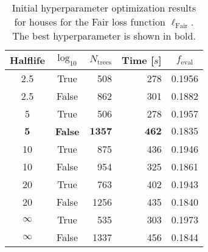 \begin{table}[h!]
  \centerfloat
  \begin{tabular}{@{}ccrrc@{}}
    Halflife & $\log_{10}$ & $N_\mathrm{trees}$ & Time [$s$] & $f_\mathrm{eval}$ \\
    \midrule
    \num{2.5} & True & \num{508} & \num{278} & \num{0.1956} \\
    \num{2.5} & False & \num{862} & \num{301} & \num{0.1882} \\
    \num{5} & True & \num{506} & \num{278} & \num{0.1957} \\
    $\mathbf{5}$ & \textbf{False} & $\mathbf{1357}$ & $\mathbf{462}$ & $\mathbf{0.1835}$ \\
    \num{10} & True & \num{875} & \num{436} & \num{0.1946} \\
    \num{10} & False & \num{954} & \num{325} & \num{0.1861} \\
    \num{20} & True & \num{763} & \num{402} & \num{0.1943} \\
    \num{20} & False & \num{1256} & \num{435} & \num{0.1840} \\
    $\infty$ & True & \num{535} & \num{303} & \num{0.1973} \\
    $\infty$ & False & \num{1337} & \num{456} & \num{0.1844} \\
  \end{tabular}
  \caption[Initial Hyperparameter Optimization Results for Houses -- Fair Loss Function]{\label{tab:h:HPO_initial_Fair-villa-appendix}Initial hyperparameter optimization results for houses for the Fair loss function $\ell_\mathrm{Fair}$. The best hyperparameter is shown in bold.}
\end{table}

